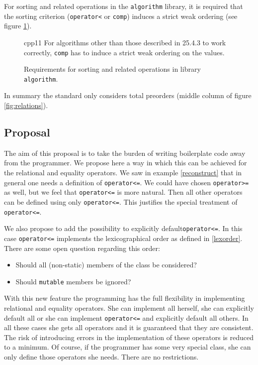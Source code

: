 ﻿\documentclass[a4paper,11pt,final]{article}
\newcommand{\tcode}[1]{\lstinline[basicstyle=\normalsize\ttfamily]{#1}}
\numberwithin{equation}{subsection}
\begin{document}
For sorting and related operations in the \verb|algorithm| library, it is required that the sorting criterion (\tcode{operator<} or \tcode{comp}) induces a strict weak ordering (see figure \ref{fig:algorithm}). 
\begin{figure}[h!]
\SetCiteCommand{\citetalias}
\begin{displaycquote}[][\S 25.4 p3]{cpp11}
\textelp{} For algorithms other than those described in 25.4.3 to work correctly, \texttt{comp} has to induce a strict weak ordering on the values.
\end{displaycquote}
\caption{Requirements for sorting and related operations in library \texttt{algorithm}.}
\label{fig:algorithm}
\end{figure}

In summary the standard only considers total preorders (middle column of figure \ref{fig:relations}).

\subsection{Proposal}
The aim of this proposal is to take the burden of writing boilerplate code away from the programmer. We propose here a way in which this can be achieved for the relational and equality operators. We saw in example \ref{reconstruct} that in general one needs a definition of \tcode{operator<=}. We could have chosen \tcode{operator>=} as well, but we feel that \tcode{operator<=} is more natural. Then all other operators can be defined using only \tcode{operator<=}. This justifies the special treatment of \tcode{operator<=}.\par

We also propose to add the possibility to explicitly default\tcode{operator<=}. In this case \tcode{operator<=} implements the lexicographical order as defined in \ref{lexorder}. There are some open question regarding this order:
\begin{itemize}
\item Should all (non-static) members of the class be considered?
\item Should \verb|mutable| members be ignored?
\end{itemize}

With this new feature the programming has the full flexibility in implementing relational and equality operators. She can implement all herself, she can explicitly default all or she can implement \tcode{operator<=} and explicitly default all others. In all these cases she gets all operators and it is guaranteed that they are consistent. The risk of introducing errors in the implementation of these operators is reduced to a minimum. Of course, if the programmer has some very special class, she can only define those operators she needs. There are no restrictions.\par
\end{document}
